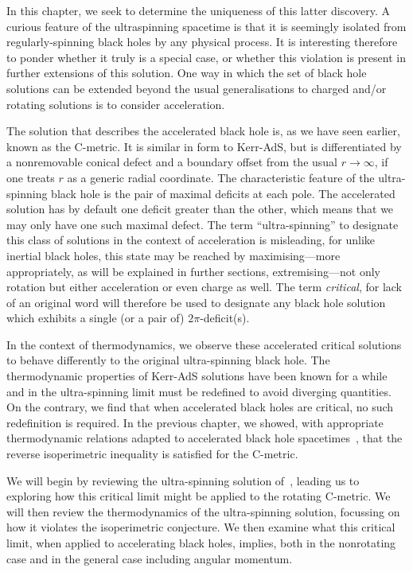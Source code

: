 \documentclass[
twoside,
openright,
frontopenright,
]{dmathesis}
\begin{document}
In this chapter, we seek to determine the uniqueness of this latter discovery. A
curious feature of the ultraspinning spacetime is that it is seemingly isolated
from regularly-spinning black holes by any physical process. It is interesting
therefore to ponder whether it truly is a special case, or whether this
violation is present in further extensions of this solution. One way in which
the set of black hole solutions can be extended beyond the usual generalisations
to charged and/or rotating solutions is to consider acceleration.

The solution that describes the accelerated black hole is, as we have seen
earlier, known as the C-metric. It is similar in form to Kerr-AdS, but is
differentiated by a nonremovable conical defect and a boundary offset from the
usual $r\to\infty$, if one treats $r$ as a generic radial coordinate. The
characteristic feature of the ultra-spinning black hole is the pair of maximal
deficits at each pole. The accelerated solution has by default one deficit
greater than the other, which means that we may only have one such maximal
defect. The term ``ultra-spinning'' to designate this class of solutions in the
context of acceleration is misleading, for unlike inertial black holes, this
state may be reached by maximising---more appropriately, as will be explained in
further sections, extremising---not only rotation but either acceleration or
even charge as well. The term \emph{critical}, for lack of an original word will
therefore be used to designate any black hole solution which exhibits a single
(or a pair of) $2\pi$-deficit(s).

In the context of thermodynamics, we observe these accelerated critical
solutions to behave differently to the original ultra-spinning black hole. The
thermodynamic properties of Kerr-AdS solutions have been known for a
while~\cite{Gibbons:2004ai, Silva:2002jq, Caldarelli:1999xj, Hawking:1998kw,
  Kostelecky:1995ei, Hawking:1982dh} and in the ultra-spinning limit must be
redefined to avoid diverging quantities. On the contrary, we find that when
accelerated black holes are critical, no such redefinition is required. In the
previous chapter, we showed, with appropriate thermodynamic relations adapted to
accelerated black hole spacetimes~\cite{Appels:2016uha,Appels:2017xoe}, that the
reverse isoperimetric inequality is satisfied for the C-metric.

We will begin by reviewing the ultra-spinning solution
of~\cite{Caldarelli:1999xj,Klemm:2014rda,Hennigar:2014cfa}, leading us to
exploring how this critical limit might be applied to the rotating C-metric. We
will then review the thermodynamics of the ultra-spinning solution, focussing on
how it violates the isoperimetric conjecture. We then examine what this critical
limit, when applied to accelerating black holes, implies, both in the
nonrotating case and in the general case including angular momentum.
\end{document}
